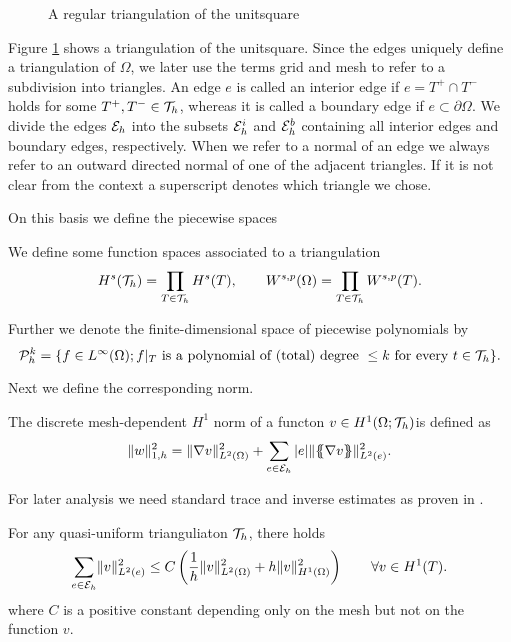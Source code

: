 \begin{figure}[H]

\caption{A regular triangulation of the unitsquare}
 \label{fig: triangulation}
\end{figure}

Figure \ref{fig: triangulation} shows a triangulation of the unitsquare. Since the edges uniquely define a triangulation of $\Omega$, we later use the terms grid and mesh to refer to a subdivision into triangles.
An edge $e$ is called an interior edge if $e=T^+ \cap T^-$ holds for some $T^+,T^- \in \mathcal{T}_h$, whereas it is called a boundary edge if $e \subset \partial \Omega$.
We divide the edges $\mathcal{E}_h$ into the subsets $\mathcal{E}_h^i$ and $\mathcal{E}_h^b$ containing all interior edges and boundary edges, respectively. 
When we refer to a normal of an edge we always refer to an outward directed normal of one of the adjacent triangles. If it is not clear from the context a superscript denotes which triangle we chose.

On this basis we define the piecewise spaces
\begin{definition}
We define some function spaces associated to a triangulation
\begin{align}
	H^s(\mathcal{T}_h) = \prod\limits_{T\in \mathcal{T}_h}  H^s(T), \qquad W^{s,p}(\Omega) = \prod\limits_{T\in \mathcal{T}_h} W^{s,p}(T).
\end{align}	
\end{definition}

\begin{definition} \label{def: piecewise polySpace}
	Further we denote the finite-dimensional space of piecewise polynomials by
\[	
	\mathcal P^k_h = \{ f \in L^\infty(\Omega); f \arrowvert_T \textnormal{ is a polynomial of (total) degree } \leq k \textnormal{ for every } t \in \mathcal T_h\}.
\]
\end{definition}
Next we define the corresponding norm.
\begin{definition} \label{def: discrete h1 norm}
	The discrete mesh-dependent $H^1$ norm of a functon $v \in H^1(\Omega;\mathcal{T}_h)$is defined as 
\[	
		\lVert w \rVert_{1,h} ^2 = \lVert \nabla v  \rVert_{L^2(\Omega)}^2 + \sum_{e \in \mathcal{E}_h} |e| \lVert \{\!\!\{ \nabla v  \}\!\!\} \rVert_{L^2(e)}^2.
\]
\end{definition}

For later analysis we need standard trace and inverse estimates as proven in \cite[Section 1.6 and Section 4.5]{BS2002}.
\begin{lemma}\label{la: trace estimate}
	For any quasi-uniform trianguliaton $\mathcal{T}_h$, there holds
	\[
	\sum_{e \in \mathcal{E}_h} \lVert v \rVert_{L^2(e)}^2 \leq C\left(\frac 1 {h} \lVert v \rVert_{L^2(\Omega)}^2  + h \lVert v \rVert_{H^1(\Omega)}^2\right) \qquad \forall v \in H^1(T).
	\]
	 where $C$ is a positive constant depending only on the mesh but not on the function $v$.
\end{lemma}

